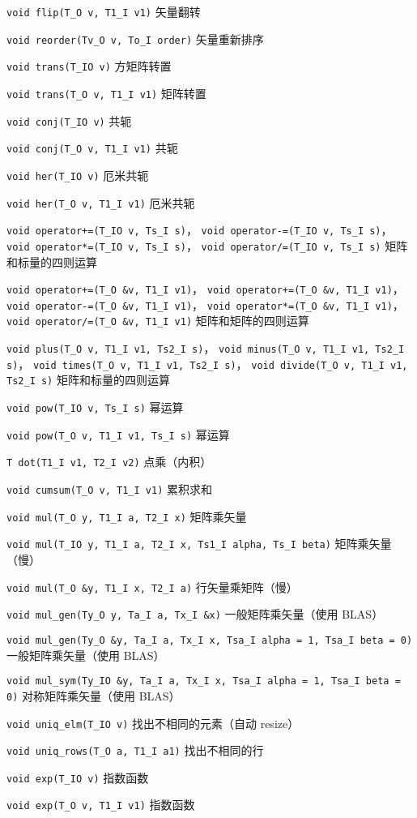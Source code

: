 \verb|void flip(T_O v, T1_I v1)| 矢量翻转

\verb|void reorder(Tv_O v, To_I order)| 矢量重新排序

\verb|void trans(T_IO v)| 方矩阵转置

\verb|void trans(T_O v, T1_I v1)| 矩阵转置

\verb|void conj(T_IO v)| 共轭

\verb|void conj(T_O v, T1_I v1)| 共轭

\verb|void her(T_IO v)| 厄米共轭

\verb|void her(T_O v, T1_I v1)| 厄米共轭

\verb|void operator+=(T_IO v, Ts_I s)|， \verb|void operator-=(T_IO v, Ts_I s)|， \verb|void operator*=(T_IO v, Ts_I s)|， \verb|void operator/=(T_IO v, Ts_I s)| 矩阵和标量的四则运算

\verb|void operator+=(T_O &v, T1_I v1)|， \verb|void operator+=(T_O &v, T1_I v1)|， \verb|void operator-=(T_O &v, T1_I v1)|， \verb|void operator*=(T_O &v, T1_I v1)|， \verb|void operator/=(T_O &v, T1_I v1)| 矩阵和矩阵的四则运算

\verb|void plus(T_O v, T1_I v1, Ts2_I s)|， \verb|void minus(T_O v, T1_I v1, Ts2_I s)|， \verb|void times(T_O v, T1_I v1, Ts2_I s)|， \verb|void divide(T_O v, T1_I v1, Ts2_I s)| 矩阵和标量的四则运算

\verb|void pow(T_IO v, Ts_I s)| 幂运算

\verb|void pow(T_O v, T1_I v1, Ts_I s)| 幂运算

\verb|T dot(T1_I v1, T2_I v2)| 点乘（内积）

\verb|void cumsum(T_O v, T1_I v1)| 累积求和

\verb|void mul(T_O y, T1_I a, T2_I x)| 矩阵乘矢量

\verb|void mul(T_IO y, T1_I a, T2_I x, Ts1_I alpha, Ts_I beta)| 矩阵乘矢量（慢）

\verb|void mul(T_O &y, T1_I x, T2_I a)| 行矢量乘矩阵（慢）

\verb|void mul_gen(Ty_O y, Ta_I a, Tx_I &x)| 一般矩阵乘矢量（使用 BLAS）

\verb|void mul_gen(Ty_O &y, Ta_I a, Tx_I x, Tsa_I alpha = 1, Tsa_I beta = 0)| 一般矩阵乘矢量（使用 BLAS）

\verb|void mul_sym(Ty_IO &y, Ta_I a, Tx_I x, Tsa_I alpha = 1, Tsa_I beta = 0)| 对称矩阵乘矢量（使用 BLAS）

\verb|void uniq_elm(T_IO v)| 找出不相同的元素（自动 resize）

\verb|void uniq_rows(T_O a, T1_I a1)| 找出不相同的行

\verb|void exp(T_IO v)| 指数函数

\verb|void exp(T_O v, T1_I v1)| 指数函数
